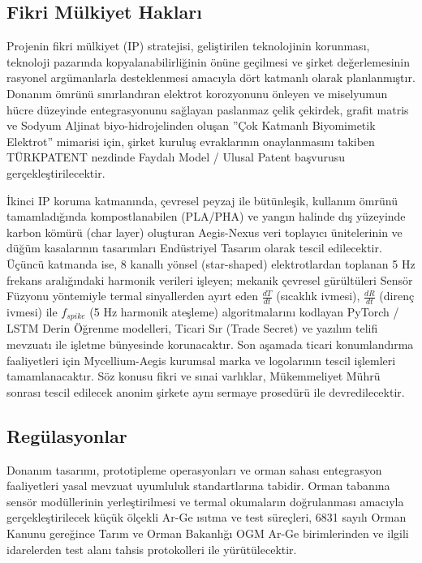 \documentclass[11pt,a4paper]{article}
\begin{document}
\subsection{Fikri Mülkiyet Hakları}

Projenin fikri mülkiyet (IP) stratejisi, geliştirilen teknolojinin korunması, teknoloji pazarında kopyalanabilirliğinin önüne geçilmesi ve şirket değerlemesinin rasyonel argümanlarla desteklenmesi amacıyla dört katmanlı olarak planlanmıştır. Donanım ömrünü sınırlandıran elektrot korozyonunu önleyen ve miselyumun hücre düzeyinde entegrasyonunu sağlayan paslanmaz çelik çekirdek, grafit matris ve Sodyum Aljinat biyo-hidrojelinden oluşan ''Çok Katmanlı Biyomimetik Elektrot'' mimarisi için, şirket kuruluş evraklarının onaylanmasını takiben TÜRKPATENT nezdinde Faydalı Model / Ulusal Patent başvurusu gerçekleştirilecektir.

İkinci IP koruma katmanında, çevresel peyzaj ile bütünleşik, kullanım ömrünü tamamladığında kompostlanabilen (PLA/PHA) ve yangın halinde dış yüzeyinde karbon kömürü (char layer) oluşturan Aegis-Nexus veri toplayıcı ünitelerinin ve düğüm kasalarının tasarımları Endüstriyel Tasarım olarak tescil edilecektir. Üçüncü katmanda ise, 8 kanallı yönsel (star-shaped) elektrotlardan toplanan 5 Hz frekans aralığındaki harmonik verileri işleyen; mekanik çevresel gürültüleri Sensör Füzyonu yöntemiyle termal sinyallerden ayırt eden $\frac{dT}{dt}$ (sıcaklık ivmesi), $\frac{dR}{dt}$ (direnç ivmesi) ile $f_{spike}$ (5 Hz harmonik ateşleme) algoritmalarını kodlayan PyTorch / LSTM Derin Öğrenme modelleri, Ticari Sır (Trade Secret) ve yazılım telifi mevzuatı ile işletme bünyesinde korunacaktır. Son aşamada ticari konumlandırma faaliyetleri için Mycellium-Aegis kurumsal marka ve logolarının tescil işlemleri tamamlanacaktır. Söz konusu fikri ve sınai varlıklar, Mükemmeliyet Mührü sonrası tescil edilecek anonim şirkete aynı sermaye prosedürü ile devredilecektir.

\subsection{Regülasyonlar}

Donanım tasarımı, prototipleme operasyonları ve orman sahası entegrasyon faaliyetleri yasal mevzuat uyumluluk standartlarına tabidir. Orman tabanına sensör modüllerinin yerleştirilmesi ve termal okumaların doğrulanması amacıyla gerçekleştirilecek küçük ölçekli Ar-Ge ısıtma ve test süreçleri, 6831 sayılı Orman Kanunu gereğince Tarım ve Orman Bakanlığı OGM Ar-Ge birimlerinden ve ilgili idarelerden test alanı tahsis protokolleri ile yürütülecektir.
\end{document}

